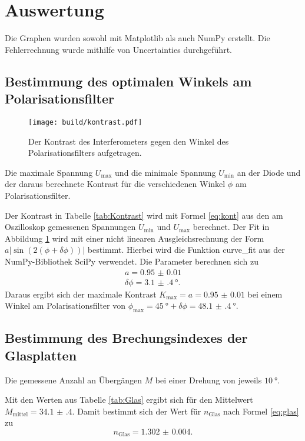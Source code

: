 \section{Auswertung}
\label{sec:Auswertung}
Die Graphen wurden sowohl mit Matplotlib \cite{matplotlib} als auch NumPy \cite{numpy} erstellt. Die
Fehlerrechnung wurde mithilfe von Uncertainties \cite{uncertainties} durchgeführt.
\subsection{Bestimmung des optimalen Winkels am Polarisationsfilter}
\label{ssec:polar}
\begin{figure}
	\centering
	\texttt{[image: build/kontrast.pdf]}
	\caption{Der Kontrast des Interferometers gegen den Winkel des Polarisationsfilters aufgetragen.}
	\label{fig:kontrast}
\end{figure}
\begin{table}
	\centering
	\caption{Die maximale Spannung $U_\text{max}$ und die minimale Spannung $U_\text{min}$ an der Diode und der daraus berechnete Kontrast für die verschiedenen Winkel $\phi$ am Polarisationsfilter.}
	
\end{table}
Der Kontrast in Tabelle \ref{tab:Kontrast} wird mit Formel \eqref{eq:kont} aus den am Oszilloskop gemessenen Spannungen $U_\text{min}$ und $U_\text{max}$ berechnet. Der Fit in Abbildung \ref{fig:kontrast} wird mit einer nicht linearen Ausgleichsrechnung der Form $a |\sin(2(\phi+\delta\phi))|$ bestimmt. Hierbei wird die Funktion curve\_fit aus der NumPy-Bibliothek SciPy \cite{scipy} verwendet. Die Parameter berechnen sich zu
\begin{gather*}
a=\num{0.95(1)}\\
\delta\phi=\SI{3.1(4)}{\degree}.
\end{gather*}
Daraus ergibt sich der maximale Kontrast $K_\text{max}=a=\num{0.95(1)}$ bei einem Winkel am Polarisationsfilter von $\phi_\text{max}=\SI{45}{\degree}+\delta\phi=\SI{48.1(4)}{\degree}$.

\subsection{Bestimmung des Brechungsindexes der Glasplatten}
\label{ssec:glas}
\begin{table}
	\centering
	\caption{Die gemessene Anzahl an Übergängen $M$ bei einer Drehung von jeweils $\SI{10}{\degree}$.}
	
\end{table}
Mit den Werten aus Tabelle \ref{tab:Glas} ergibt sich für den Mittelwert $M_\text{mittel}=\num{34.1(4)}$. Damit bestimmt sich der Wert für $n_\text{Glas}$ nach Formel \eqref{eq:glas} zu
\begin{displaymath}
	n_\text{Glas}=\num{1.302(4)}.
\end{displaymath}

